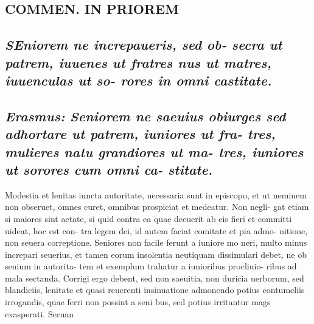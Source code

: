 \documentclass{article}
\begin{document}
\begin{pages}
\section*{COMMEN. IN PRIOREM }
\marginpar{[ p.114 ]}
{}
\subsection*{\textit{\huge\textbf{S}\normalsize Eniorem ne increpaueris, sed ob- secra ut patrem, iuuenes ut fratres nus ut matres, iuuenculas ut so- rores in omni castitate. }}
{}
\subsection*{\textit{Erasmus: Seniorem ne saeuius obiurges sed adhortare ut patrem, iuniores ut fra- tres, mulieres natu grandiores ut ma- tres, iuniores ut sorores cum omni ca- stitate. }}\pstart Modestia et lenitas iuncta autoritate, necessaria sunt in episcopo, et ut neminem non obseruet, omnes curet, omnibus prospiciat et medeatur. Non negli- gat etiam si maiores sint aetate, si quid contra ea quae decuerit ab eis fieri et committi uideat, hoc est con- tra legem dei, id autem faciat comitate et pia admo- nitione, non seuera correptione.  \pend\pstart Seniores non facile ferunt a iuniore mo neri, multo minus increpari seuerius, et tamen eorum insolentia neutiquam dissimulari debet, ne ob senium in autorita- tem et exemplum trahatur a iunioribus procliuio- ribus ad mala sectanda. Corrigi ergo debent, sed non saeuitia, non duricia uerborum, sed blandiciis, lenitate et quasi reuerenti insinuatione admonendo potius contumeliis irrogandis, quae ferri non possint a seni bus, sed potius irritantur mags exasperati. Seruan  \pend

\end{pages}
\end{document}
